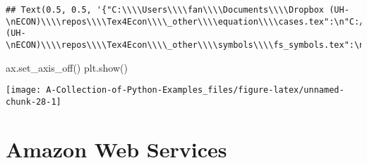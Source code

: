 \documentclass[
]{book}
\newenvironment{Shaded}{\begin{snugshade}}{\end{snugshade}}
\newcommand{\NormalTok}[1]{#1}
\begin{document}
\begin{verbatim}
## Text(0.5, 0.5, '{"C:\\\\Users\\\\fan\\\\Documents\\\\Dropbox (UH-\nECON)\\\\repos\\\\Tex4Econ\\\\_other\\\\equation\\\\cases.tex":\n"C:/Users/fan/Documents/cases.pdf",\n"C:\\\\Users\\\\fan\\\\Documents\\\\Dropbox (UH-\nECON)\\\\repos\\\\Tex4Econ\\\\_other\\\\symbols\\\\fs_symbols.tex":\n"C:/Users/fan/Documents/fs_symbols.pdf"}')
\end{verbatim}

\begin{Shaded}
\begin{Highlighting}[]
\NormalTok{ax.set_axis_off()}
\NormalTok{plt.show()}
\end{Highlighting}
\end{Shaded}

\begin{center}\texttt{[image: A-Collection-of-Python-Examples\_files/figure-latex/unnamed-chunk-28-1]} \end{center}

\hypertarget{amazon-web-services}{%
\chapter{Amazon Web Services}\label{amazon-web-services}}
\end{document}
